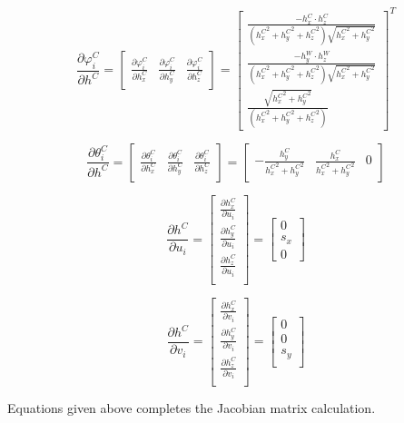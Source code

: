 \begin{equation}
\label{eq:par_varphi_h}
\frac{\partial \varphi_{i}^{C}}{\partial h^{C}}= 
\begin{bmatrix}
\frac{\partial \varphi_{i}^{C}}{\partial h_{x}^{C}} & 
\frac{\partial \varphi_{i}^{C}}{\partial h_{y}^{C}} & 
\frac{\partial \varphi_{i}^{C}}{\partial h_{z}^{C}}
\end{bmatrix}=\begin{bmatrix}
\frac{-h_{x}^{C}\cdot h_{z}^{C}}{({h_{x}^{C}}^{2}+{h_{y}^{C}}^{2}+{h_{z}^{C}}^{2})\sqrt{{h_{x}^{C}}^{2}+{h_{y}^{C}}^{2}}} \\
\frac{-h_{y}^{W}\cdot h_{z}^{W}}{({h_{x}^{C}}^{2}+{h_{y}^{C}}^{2}+{h_{z}^{C}}^{2})\sqrt{{h_{x}^{C}}^{2}+{h_{y}^{C}}^{2}}} \\
\frac{\sqrt{{h_{x}^{C}}^{2}+{h_{y}^{C}}^{2}}}{({h_{x}^{C}}^{2}+{h_{y}^{C}}^{2}+{h_{z}^{C}}^{2})}
\end{bmatrix}^{T}
\end{equation}

\begin{equation}
\label{eq:par_theta_h}
\frac{\partial \theta_{i}^{C}}{\partial h^{C}}=\begin{bmatrix}
\frac{\partial \theta_{i}^{C}}{\partial h_{x}^{C}} & 
\frac{\partial \theta_{i}^{C}}{\partial h_{y}^{C}} & 
\frac{\partial \theta_{i}^{C}}{\partial h_{z}^{C}} \end{bmatrix}
=\begin{bmatrix}
-\frac{h_{y}^{C}}{{h_{x}^{C}}^{2}+{h_{y}^{C}}^{2}} & 
\frac{h_{x}^{C}}{{h_{x}^{C}}^{2}+{h_{y}^{C}}^{2}} & 0
\end{bmatrix}
\end{equation}

\begin{equation}
\frac{\partial h^{C}}{\partial u_{i}}=\begin{bmatrix}
\frac{\partial h_{x}^{C}}{\partial u_{i}} \\
\frac{\partial h_{y}^{C}}{\partial u_{i}} \\
\frac{\partial h_{z}^{C}}{\partial u_{i}} \\
\end{bmatrix}= \begin{bmatrix}
0 \\
s_{x}\\
0
\end{bmatrix}
\end{equation}

\begin{equation}
\frac{\partial h^{C}}{\partial v_{i}}=\begin{bmatrix}
\frac{\partial h_{x}^{C}}{\partial v_{i}}\\
\frac{\partial h_{y}^{C}}{\partial v_{i}}\\
\frac{\partial h_{z}^{C}}{\partial v_{i}}\\
\end{bmatrix}= \begin{bmatrix}
0 \\
0 \\
s_{y}\\
\end{bmatrix}
\end{equation}

Equations given above completes the Jacobian matrix calculation.

